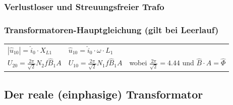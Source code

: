 		\subsubsection{Verlustloser und Streuungsfreier Trafo}
			 	
		\subsubsection{Transformatoren-Hauptgleichung (gilt bei Leerlauf)}
			\begin{tabular}{p{7cm}p{4.5cm}p{5cm}}
      			$| \hat{u}_{10} | = \hat{i}_0 \cdot X_{L1}$
      			& 	$\hat{u}_{10} = \hat{i}_0 \cdot \omega \cdot L_1$ \\
      		
				$U_{20} = \frac{2\pi}{\sqrt{2}}N_2 f \hat{B}_1 A$
				&
            	$U_{10} = \frac{2\pi}{\sqrt{2}}N_1 f \hat{B}_1 A$ &
					wobei $\frac{2\pi}{\sqrt{2}} = 4.44$ und $\hat{B} \cdot A = \hat{\Phi}$ 
			\end{tabular}
	\subsection{Der reale (einphasige) Transformator}
